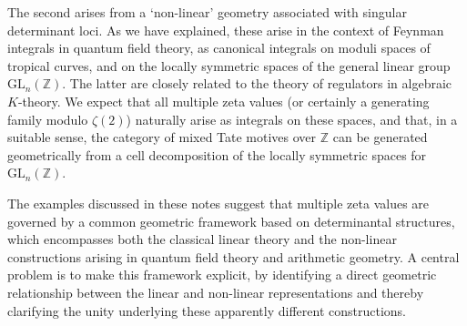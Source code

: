 \documentclass[12pt]{amsart}
\newcommand{\ZZ}{{\mathbb Z}}
\theoremstyle{plain}
\newcommand{\GL}{\mathrm{GL}}
\newcommand{\0}{\color{blue}{\mathsf{0}}}
\begin{document}
The second arises from a `non-linear' geometry associated with  singular determinant loci. As we have explained, these arise in the context of Feynman integrals in quantum field theory, as canonical integrals on   moduli spaces of tropical curves, and  on the locally symmetric spaces of the general linear group $\GL_n(\ZZ)$.  The latter are closely related  to the theory of regulators in  algebraic $K$-theory. We expect that all multiple zeta values (or certainly a generating family modulo $\zeta(2)$) naturally arise as  integrals on these spaces, and that, in a suitable sense, the category of mixed Tate motives over $\ZZ$ can be generated geometrically   from a cell decomposition of the locally symmetric spaces  for   $\GL_n(\ZZ)$.
 
The examples discussed in these notes suggest that multiple zeta values are governed by a common geometric framework based on determinantal structures, which encompasses both the classical linear theory and the non-linear constructions arising in quantum field theory and arithmetic geometry. A central problem is to make this framework explicit, by identifying a direct geometric relationship between the linear and non-linear representations and thereby clarifying the unity underlying these apparently different constructions.




\renewcommand\refname{References}




\end{document}
